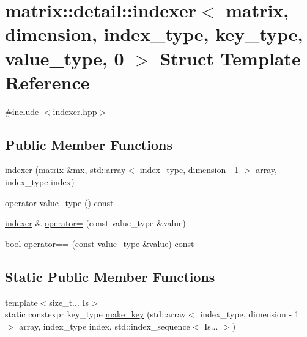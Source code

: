 \hypertarget{structmatrix_1_1detail_1_1indexer_3_01matrix_00_01dimension_00_01index__type_00_01key__type_00_01value__type_00_010_01_4}{}\section{matrix\+:\+:detail\+:\+:indexer$<$ matrix, dimension, index\+\_\+type, key\+\_\+type, value\+\_\+type, 0 $>$ Struct Template Reference}
\label{structmatrix_1_1detail_1_1indexer_3_01matrix_00_01dimension_00_01index__type_00_01key__type_00_01value__type_00_010_01_4}


{\ttfamily \#include $<$indexer.\+hpp$>$}

\subsection*{Public Member Functions}
\begin{DoxyCompactItemize}
\item 
\hyperlink{structmatrix_1_1detail_1_1indexer_3_01matrix_00_01dimension_00_01index__type_00_01key__type_00_01value__type_00_010_01_4_a92fff7aee8b6fcb621f389ee5c97e2c7}{indexer} (\hyperlink{structmatrix_1_1matrix}{matrix} \&mx, std\+::array$<$ index\+\_\+type, dimension -\/ 1 $>$ array, index\+\_\+type index)
\item 
\hyperlink{structmatrix_1_1detail_1_1indexer_3_01matrix_00_01dimension_00_01index__type_00_01key__type_00_01value__type_00_010_01_4_acb09c61514021a6302f54c3f6218d646}{operator value\+\_\+type} () const
\item 
\hyperlink{structmatrix_1_1detail_1_1indexer}{indexer} \& \hyperlink{structmatrix_1_1detail_1_1indexer_3_01matrix_00_01dimension_00_01index__type_00_01key__type_00_01value__type_00_010_01_4_a568ee7675a21d6dc1b468634e9771df0}{operator=} (const value\+\_\+type \&value)
\item 
bool \hyperlink{structmatrix_1_1detail_1_1indexer_3_01matrix_00_01dimension_00_01index__type_00_01key__type_00_01value__type_00_010_01_4_a0ac3d582bcac12b3958e5d1f7d2de3b9}{operator==} (const value\+\_\+type \&value) const
\end{DoxyCompactItemize}
\subsection*{Static Public Member Functions}
\begin{DoxyCompactItemize}
\item 
{\footnotesize template$<$size\+\_\+t... Is$>$ }\\static constexpr key\+\_\+type \hyperlink{structmatrix_1_1detail_1_1indexer_3_01matrix_00_01dimension_00_01index__type_00_01key__type_00_01value__type_00_010_01_4_abb061b65dba3dca0184fc9087ad60a34}{make\+\_\+key} (std\+::array$<$ index\+\_\+type, dimension -\/ 1 $>$ array, index\+\_\+type index, std\+::index\+\_\+sequence$<$ Is... $>$)
\end{DoxyCompactItemize}


